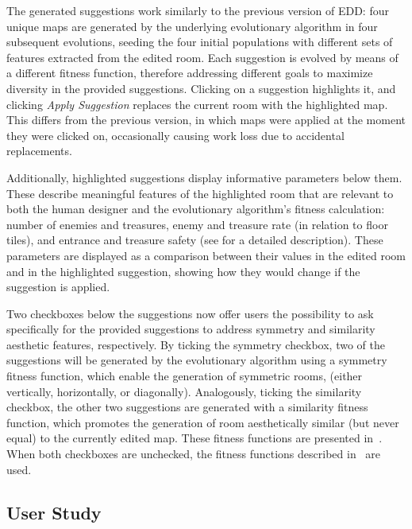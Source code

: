 The generated suggestions work similarly to the previous version of EDD: four unique maps are generated by the underlying evolutionary algorithm in four subsequent evolutions, seeding the four initial populations with different sets of features extracted from the edited room. Each suggestion is evolved by means of a different fitness function, therefore addressing different goals to maximize diversity in the provided suggestions. Clicking on a suggestion highlights it, and clicking \textit{Apply Suggestion} replaces the current room with the highlighted map. This differs from the previous version, in which maps were applied at the moment they were clicked on, occasionally causing work loss due to accidental replacements. 

Additionally, highlighted suggestions display informative parameters below them. These describe meaningful features of the highlighted room that are relevant to both the human designer and the evolutionary algorithm's fitness calculation: number of enemies and treasures, enemy and treasure rate (in relation to floor tiles), and entrance and treasure safety (see  for a detailed description). These parameters are displayed as a comparison between their values in the edited room and in the highlighted suggestion, showing how they would change if the suggestion is applied. 

Two checkboxes below the suggestions now offer users the possibility to ask specifically for the provided suggestions to address symmetry and similarity aesthetic features, respectively. By ticking the symmetry checkbox, two of the suggestions will be generated by the evolutionary algorithm using a symmetry fitness function, which enable the generation of symmetric rooms, (either vertically, horizontally, or diagonally). Analogously, ticking the similarity checkbox, the other two suggestions are generated with a similarity fitness function, which promotes the generation of room aesthetically similar (but never equal) to the currently edited map. These fitness functions are presented in~. When both checkboxes are unchecked, the fitness functions described in~ are used.

\subsection{User Study} \label{p1userstudy} 



